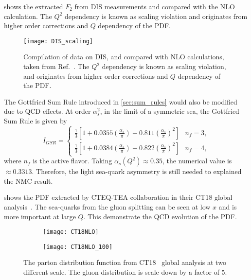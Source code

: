 \documentclass[../main.tex]{subfiles}
\begin{document}
 shows the extracted $F_2$ from DIS measurements and compared
with the NLO calculation. The $Q^2$ dependency is known as scaling violation and
originates from higher order corrections and $Q$ dependency of the PDF.
\begin{figure}[h!]
	\centering
	\texttt{[image: DIS\_scaling]}
	\caption{
		Compilation of data on DIS, and compared with NLO calculations,
		taken from Ref.~\cite{adloff2003}.
		The $Q^2$ dependency is known as scaling violation,
		and originates from higher order corrections and $Q$ dependency of the PDF.
	}
	\label{fig:DIS_scaling}
\end{figure}
The Gottfried Sum Rule introduced in \cref{sec:sum_rules} would also be modified due to
QCD effects. At order $\alpha_s^2$, in the limit of a symmetric sea, the Gottfried Sum Rule
is given by~\cite{kataev2003}
\begin{equation}
	I_{GSR} = \begin{cases}
		\frac{1}{3}\left[ 1 + 0.0355\left(\frac{\alpha_s}{\pi}\right)-0.811\left(\frac{\alpha_s}{\pi}\right)^2 \right] & n_f=3, \\
		\frac{1}{3}\left[ 1 + 0.0384\left(\frac{\alpha_s}{\pi}\right)-0.822\left(\frac{\alpha_s}{\pi}\right)^2 \right] & n_f=4,
	\end{cases}
\end{equation}
where $n_f$ is the active flavor.
Taking $\alpha_s(Q^2)\approx 0.35$, the numerical value is $\approx 0.3313$. Therefore,
the light sea-quark asymmetry is still needed to explained the NMC result.

 shows the PDF extracted by CTEQ-TEA collaboration in their
CT18 global analysis~\cite{hou2021}. The sea-quarks from the gluon splitting
can be seen at low $x$ and is more important at large $Q$. This demonstrate the
QCD evolution of the PDF.

\begin{figure}
	\centering
	\begin{subfigure}{0.45\linewidth}
		\texttt{[image: CT18NLO]}
	\end{subfigure}
	\begin{subfigure}{0.45\linewidth}
		\texttt{[image: CT18NLO\_100]}
	\end{subfigure}
	\caption{The parton distribution function from CT18~\cite{hou2021} global analysis at two different scale.
		The gluon distribution is scale down by a factor of 5.}
	\label{fig:CT18_scale}
\end{figure}
\end{document}
